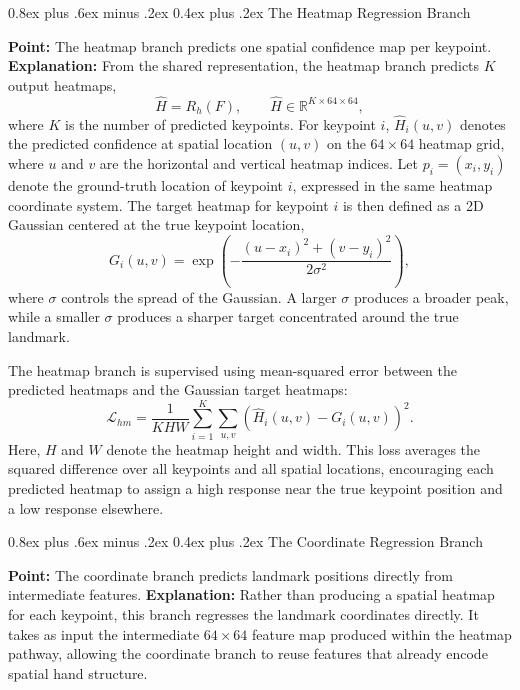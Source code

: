 \documentclass[10pt,letterpaper]{article}
\makeatletter
\renewcommand\subsubsection{\@startsection{subsubsection}{3}{\z@}%
  {0.8ex plus .6ex minus .2ex}%
  {0.4ex plus .2ex}%
  {\normalfont\small\itshape}}
\makeatother
\begin{document}
\subsubsection{The Heatmap Regression Branch}

\noindent\textbf{Point:} The heatmap branch predicts one spatial confidence map per keypoint.  
\textbf{Explanation:} From the shared representation, the heatmap branch predicts \(K\) output heatmaps,
\[
\hat{H} = R_h(F), \qquad \hat{H} \in \mathbb{R}^{K \times 64 \times 64},
\]
where \(K\) is the number of predicted keypoints. For keypoint \(i\), \(\hat{H}_i(u,v)\) denotes the predicted confidence at spatial location \((u,v)\) on the \(64 \times 64\) heatmap grid, where \(u\) and \(v\) are the horizontal and vertical heatmap indices. Let \(p_i = (x_i, y_i)\) denote the ground-truth location of keypoint \(i\), expressed in the same heatmap coordinate system. The target heatmap for keypoint \(i\) is then defined as a 2D Gaussian centered at the true keypoint location,
\[
G_i(u,v) = \exp\left(
-\frac{(u-x_i)^2 + (v-y_i)^2}{2\sigma^2}
\right),
\]
where \(\sigma\) controls the spread of the Gaussian. A larger \(\sigma\) produces a broader peak, while a smaller \(\sigma\) produces a sharper target concentrated around the true landmark.

The heatmap branch is supervised using mean-squared error between the predicted heatmaps and the Gaussian target heatmaps:
\[
\mathcal{L}_{hm}
=
\frac{1}{KHW}
\sum_{i=1}^{K}
\sum_{u,v}
\left(\hat{H}_i(u,v) - G_i(u,v)\right)^2.
\]
Here, \(H\) and \(W\) denote the heatmap height and width. This loss averages the squared difference over all keypoints and all spatial locations, encouraging each predicted heatmap to assign a high response near the true keypoint position and a low response elsewhere. 

\subsubsection{The Coordinate Regression Branch}

\noindent\textbf{Point:} The coordinate branch predicts landmark positions directly from intermediate features.  
\textbf{Explanation:} Rather than producing a spatial heatmap for each keypoint, this branch regresses the landmark coordinates directly. It takes as input the intermediate \(64 \times 64\) feature map produced within the heatmap pathway, allowing the coordinate branch to reuse features that already encode spatial hand structure.
\end{document}
